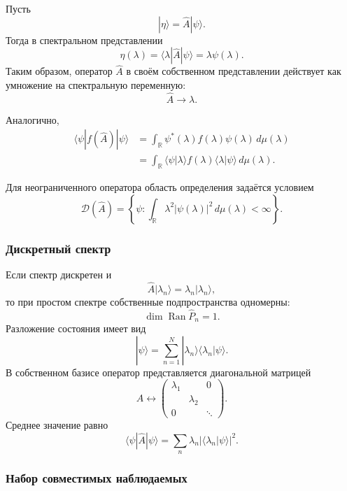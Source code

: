 \documentclass[12pt,a4paper]{article}
\begin{document}
Пусть
\[
    |\eta\rangle=\hat A|\psi\rangle.
\]
Тогда в спектральном представлении
\[
    \eta(\lambda)
    =
    \langle\lambda|\hat A|\psi\rangle
    =
    \lambda\psi(\lambda).
\]
Таким образом, оператор $\hat A$ в своём собственном представлении
действует как умножение на спектральную переменную:
\[
    \boxed{
        \hat A
        \longrightarrow
        \lambda
    }.
\]

Аналогично,
\begin{align*}
    \langle\psi|f(\hat A)|\psi\rangle
    &=
    \int_{\mathbb R}
        \psi^*(\lambda)
        f(\lambda)
        \psi(\lambda)
        \,d\mu(\lambda)
    \\
    &=
    \int_{\mathbb R}
        \langle\psi|\lambda\rangle
        f(\lambda)
        \langle\lambda|\psi\rangle
        \,d\mu(\lambda).
\end{align*}

Для неограниченного оператора область определения задаётся условием
\[
    \boxed{
    \mathcal D(\hat A)
    =
    \left\{
        \psi:
        \int_{\mathbb R}
            \lambda^2
            |\psi(\lambda)|^2
            \,d\mu(\lambda)
        <\infty
    \right\}
    }.
\]

\subsubsection{Дискретный спектр}

Если спектр дискретен и
\[
    \hat A|\lambda_n\rangle
    =
    \lambda_n|\lambda_n\rangle,
\]
то при простом спектре собственные подпространства одномерны:
\[
    \dim\operatorname{Ran}\hat P_n=1.
\]
Разложение состояния имеет вид
\[
    \boxed{
        |\psi\rangle
        =
        \sum_{n=1}^{N}
        |\lambda_n\rangle
        \langle\lambda_n|\psi\rangle
    }.
\]
В собственном базисе оператор представляется диагональной матрицей
\[
    \hat A
    \longleftrightarrow
    \begin{pmatrix}
        \lambda_1 & & 0\\
        & \lambda_2 & \\
        0 & & \ddots
    \end{pmatrix}.
\]
Среднее значение равно
\[
    \boxed{
        \langle\psi|\hat A|\psi\rangle
        =
        \sum_n
            \lambda_n
            |\langle\lambda_n|\psi\rangle|^2
    }.
\]

\subsubsection{Набор совместимых наблюдаемых}
\end{document}

